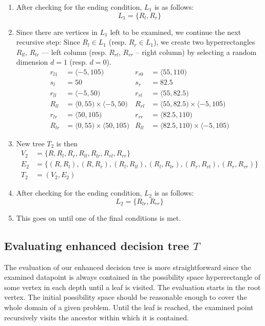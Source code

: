 \begin{example}
\begin{enumerate}
    \item After checking for the ending condition, $L_1$ is as follows:
    $$L_1 = \{R_l, R_r\}$$

    \item Since there are vertices in $L_1$ left to be examined, we continue the next recursive step:
    Since $R_l \in L_1$ (resp. $R_r \in L_1$), we create two hyperrectangles $R_{ll}$, $R_{lr}$ --- left column (resp. $R_{rl}$, $R_{rr}$ -- right column) by selecting a random dimension $d=1$ (resp. $d=0$).
    \begin{align*}
        r_{l1} &= \langle -5, 105)& r_{r0} &= \langle 55, 110) \\
        s_l &= 50 & s_r&=82.5\\
        r_{ll} &= \langle -5, 50) & r_{rl} &= \langle 55, 82.5) \\
        R_{ll} &= \langle 0, 55) \times \langle -5,50) & R_{rl} &= \langle 55, 82.5) \times \langle -5,105)\\
        r_{lr} &= \langle 50, 105) & r_{rr} &= \langle 82.5, 110) \\
        R_{lr} &= \langle 0, 55) \times \langle 50,105) & R_{ll} &= \langle 82.5, 110) \times \langle -5,105)
    \end{align*}

    \item New tree $T_2$ is then
    \begin{align*}
        V_2 &= \{R, R_l, R_r, R_{ll}, R_{lr}, R_{rl}, R_{rr}\} \\
        E_2 &= \{(R, R_l), (R, R_r), (R_l, R_{ll}), (R_l, R_{lr}), (R_r, R_{rl}), (R_r, R_{rr})\} \\
        T_2 &= (V_2, E_2)
    \end{align*}

    \item After checking for the ending condition, $L_2$ is as follows:
    $$L_2 = \{R_{lr}, R_{rr}\}$$

    \item This goes on until one of the final conditions is met.

\end{enumerate}

\end{example}

\subsection{Evaluating enhanced decision tree $T$}
The evaluation of our enhanced decision tree is more straightforward since the examined datapoint is always contained in the possibility space hyperrectangle of some vertex in each depth until a leaf is visited.
The evaluation starts in the root vertex. The initial possibility space should be reasonable enough to cover the whole domain of a given problem.
Until the leaf is reached, the examined point recursively visits the ancestor within which it is contained.



